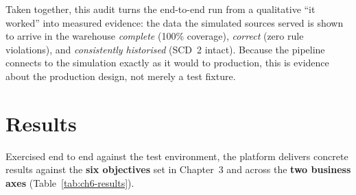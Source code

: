 Taken together, this audit turns the end-to-end run from a qualitative ``it worked'' into measured
evidence: the data the simulated sources served is shown to arrive in the warehouse \emph{complete}
(100\% coverage), \emph{correct} (zero rule violations), and \emph{consistently historised} (SCD~2
intact). Because the pipeline connects to the simulation exactly as it would to production, this is
evidence about the production design, not merely a test fixture.

\section{Results}
\label{sec:ch6-results}

Exercised end to end against the test environment, the platform delivers concrete results against the
\textbf{six objectives} set in Chapter~3 and across the \textbf{two business axes}
(Table~\ref{tab:ch6-results}).


